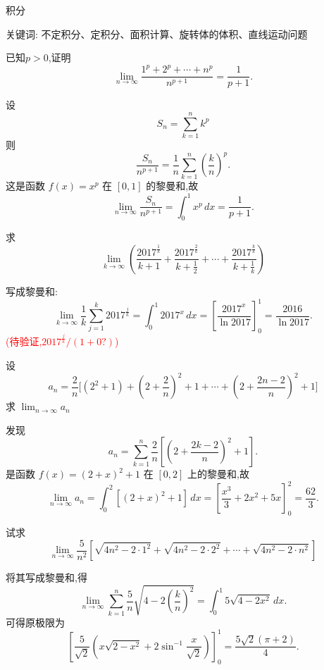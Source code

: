 \pagebreak

\begin{center}
  {\fontsize{30pt}{26pt}\selectfont
    \hypertarget{积分}{积分} \label{积分}
  }
\end{center}
\separator
\begin{center}
    关键词: 不定积分、定积分、面积计算、旋转体的体积、直线运动问题 
\end{center}
\vspace{0.5pt}

\begin{questions}
    \question 已知\( p > 0 \),证明
    \[
    \lim_{n \to \infty} \frac{1^p + 2^p + \cdots + n^p}{n^{p+1}} = \frac{1}{p + 1}.
    \]
    \begin{solution}
        设 
        \[
        S_n = \sum_{k=1}^{n} k^p
        \]
        则
        \[
        \frac{S_n}{n^{p+1}} = \frac{1}{n} \sum_{k=1}^{n} \left( \frac{k}{n} \right)^p.
        \]
        这是函数 $f(x) = x^p$ 在 $[0,1]$ 的黎曼和,故
        \[
        \lim_{n \to \infty} \frac{S_n}{n^{p+1}} = \int_0^1 x^p \, dx = \frac{1}{p+1}.
        \]
    \end{solution}
    
    \question 求
    \[
    \lim_{k \to \infty} \left( \frac{2017^{\frac{1}{k}}}{k + 1} + \frac{2017^{\frac{2}{k}}}{k + \frac{1}{2}} + \cdots + \frac{2017^{\frac{k}{k}}}{k + \frac{1}{k}} \right)
    \]
    \begin{solution}
        写成黎曼和:
        \[
        \lim_{k \to \infty} \frac{1}{k} \sum_{j=1}^{k} 2017^{\frac{j}{k}} = \int_0^1 2017^x \, dx = \left[ \frac{2017^x}{\ln 2017} \right]_0^1 = \frac{2016}{\ln 2017}.
        \]
        \textcolor{red}{(待验证,$2017^{\frac{j}{k}}/(1+0?)$)}
    \end{solution}

    \question 设
    \[
    a_{n}=\frac{2}{n}\Big[(2^{2}+1)+\left(2+\frac{2}{n}\right)^{2}+1 + \cdots + \left(2+\frac{2n-2}{n}\right)^{2}+1\Big] 
    \]
    求 $\displaystyle \lim_{n\to\infty} a_n$
    \begin{solution}
        发现
        \[
        a_n = \sum_{k=1}^n \frac{2}{n} \left[ \left( 2 + \frac{2k-2}{n} \right)^2 + 1 \right].
        \]
        是函数 $f(x) = (2+x)^2+1$ 在 $[0,2]$ 上的黎曼和,故
        \[
        \lim_{n\to\infty} a_n = \int_0^2 \left[ (2+x)^2 + 1 \right] \, dx = \left[ \frac{x^3}{3} + 2x^2 +5x \right]_0^2  = \frac{62}{3}.
        \]
    \end{solution}

    \question 试求
    \[
    \lim_{n\to \infty} \frac{5}{n^2} \left[ \sqrt{4n^2 - 2\cdot 1^2} + \sqrt{4n^2 - 2\cdot 2^2} + \cdots + \sqrt{4n^2 - 2\cdot n^2} \right]
    \]
    \begin{solution}
        将其写成黎曼和,得
        \[
        \lim_{n\to \infty} \sum_{k=1}^n \frac{5}{n} \sqrt{4 - 2 \left(\frac{k}{n}\right)^2} 
        = \int_0^1 5 \sqrt{4 - 2x^2} \, dx.
        \]
        可得原极限为
        \[
        \left[ \frac{5}{\sqrt{2}} \left( x \sqrt{2 - x^2} + 2 \sin^{-1} \frac{x}{\sqrt{2}} \right) \right]_0^1
        = \frac{5\sqrt{2} (\pi + 2)}{4}.
        \]
    \end{solution}


\end{questions}
